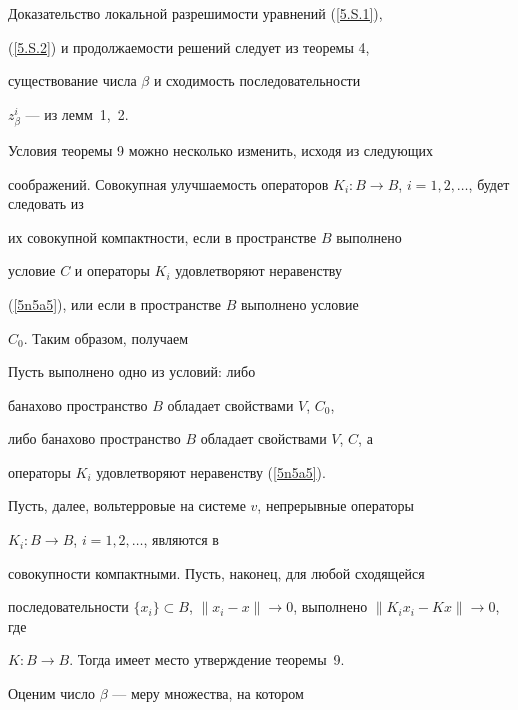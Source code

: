 Доказательство локальной разрешимости уравнений (\ref{5.S.1}),


(\ref{5.S.2}) и продолжаемости решений следует из теоремы 4,


существование числа $\beta$ и сходимость последовательности


$z_{\beta}^i$ --- из лемм~1,~2.








Условия теоремы 9 можно несколько изменить, исходя из следующих


соображений. Совокупная улучшаемость операторов $K_{i}


: B \to B$, $i=1, 2, \dotsc$, будет следовать из


их совокупной компактности, если в пространстве $B$ выполнено


условие $C$ и операторы $K_{i}$ удовлетворяют неравенству


(\ref{5n5a5}), или если в пространстве $B$ выполнено условие


$C_0$. Таким образом, получаем








\begin{cornonum}


Пусть выполнено одно из условий: либо


банахово пространство $B$ обладает свойствами $V$, $C_{0}$,


либо банахово пространство $B$ обладает свойствами $V$, $C$, а


операторы $K_{i}$ удовлетворяют неравенству (\ref{5n5a5}).


Пусть, далее, вольтерровые на системе $v$, непрерывные операторы


$K_{i}:B \to B$, $i=1, 2, \dotsc$, являются в


совокупности компактными. Пусть, наконец, для любой сходящейся


последовательности $\{x_i\} \subset B$, $\|x_i -x\|\to


0$, выполнено $\|K_i x_i - K x\|\to 0$, где


$K:B \to B$. Тогда имеет место утверждение теоремы~9.


\end{cornonum}





Оценим число $\beta$ --- меру множества, на котором


